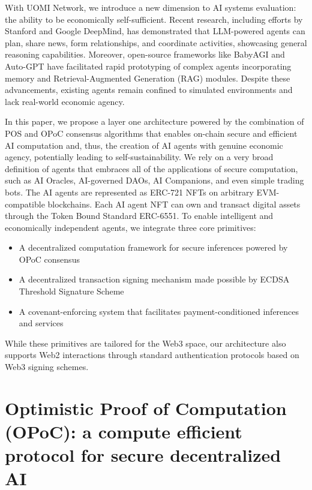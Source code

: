 \documentclass{article}
\begin{document}
With UOMI Network, we introduce a new dimension to AI systems evaluation: the ability to be economically self-sufficient. Recent research, including efforts by Stanford and Google DeepMind, has demonstrated that LLM-powered agents can plan, share news, form relationships, and coordinate activities, showcasing general reasoning capabilities. Moreover, open-source frameworks like BabyAGI and Auto-GPT have facilitated rapid prototyping of complex agents incorporating memory and Retrieval-Augmented Generation (RAG) modules. Despite these advancements, existing agents remain confined to simulated environments and lack real-world economic agency.

In this paper, we propose a layer one architecture powered by the combination of POS and OPoC consensus algorithms that enables on-chain secure and efficient AI computation and, thus, the creation of AI agents with genuine economic agency, potentially leading to self-sustainability. We rely on a very broad definition of agents that embraces all of the applications of secure computation, such as AI Oracles, AI-governed DAOs, AI Companions, and even simple trading bots. The AI agents are represented as ERC-721 NFTs on arbitrary EVM-compatible blockchains. Each AI agent NFT can own and transact digital assets through the Token Bound Standard ERC-6551. To enable intelligent and economically independent agents, we integrate three core primitives: 

\begin{itemize}
 
\item A decentralized computation framework for secure inferences powered by OPoC consensus
\item A decentralized transaction signing mechanism made possible by ECDSA Threshold Signature Scheme 
\item A covenant-enforcing system that facilitates payment-conditioned inferences and services 
\end{itemize}
While these primitives are tailored for the Web3 space, our architecture also supports Web2 interactions through standard authentication protocols based on Web3 signing schemes.



\section{Optimistic Proof of Computation (OPoC): a compute efficient protocol for secure decentralized AI}
\end{document}

